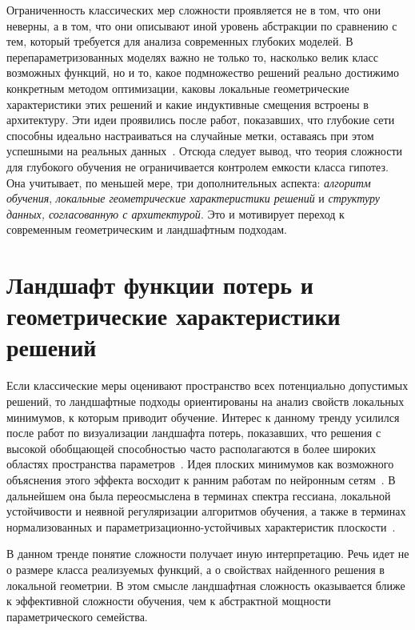 \documentclass[russian]{intsys}
\begin{document}
Ограниченность классических мер сложности проявляется не в том, что они неверны, а в том, что они описывают иной уровень абстракции по сравнению с тем, который требуется для анализа современных глубоких моделей.
В перепараметризованных моделях важно не только то, насколько велик класс возможных функций, но и то, какое подмножество решений реально достижимо конкретным методом оптимизации, каковы локальные геометрические характеристики этих решений и какие индуктивные смещения встроены в архитектуру.
Эти идеи проявились после работ, показавших, что глубокие сети способны идеально настраиваться на случайные метки, оставаясь при этом успешными на реальных данных~\cite{zhang2021rethinking}.
Отсюда следует вывод, что теория сложности для глубокого обучения не ограничивается контролем емкости класса гипотез. Она учитывает, по меньшей мере, три дополнительных аспекта: \textit{алгоритм обучения}, \textit{локальные геометрические характеристики решений} и \textit{структуру данных, согласованную с архитектурой}.
Это и мотивирует переход к современным геометрическим и ландшафтным подходам.

\section{Ландшафт функции потерь и геометрические характеристики решений}

Если классические меры оценивают пространство всех потенциально допустимых решений, то ландшафтные подходы ориентированы на анализ свойств локальных минимумов, к которым приводит обучение.
Интерес к данному тренду усилился после работ по визуализации ландшафта потерь, показавших, что решения с высокой обобщающей способностью часто располагаются в более широких областях пространства параметров~\cite{li2018visualizing,wu2017landscapes,landscape2017algorithms}.
Идея плоских минимумов как возможного объяснения этого эффекта восходит к ранним работам по нейронным сетям~\cite{hochreiter1997flat}.
В дальнейшем она была переосмыслена в терминах спектра гессиана, локальной устойчивости и неявной регуляризации алгоритмов обучения, а также в терминах нормализованных и параметризационно-устойчивых характеристик плоскости~\cite{normalizedflat2019}.

В данном тренде понятие сложности получает иную интерпретацию. Речь идет не о размере класса реализуемых функций, а о свойствах найденного решения в локальной геометрии.
В этом смысле ландшафтная сложность оказывается ближе к эффективной сложности обучения, чем к абстрактной мощности параметрического семейства.
\end{document}
